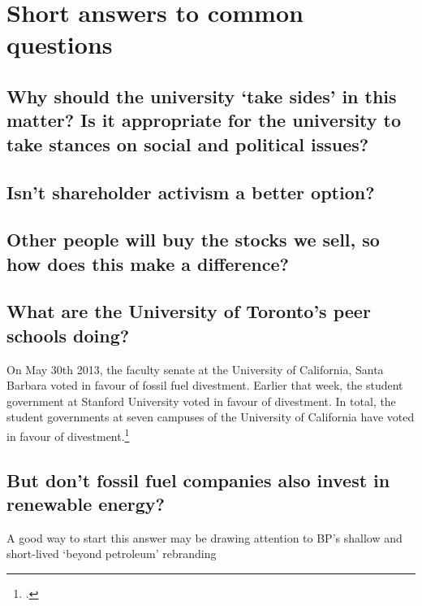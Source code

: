 


	\section{Short answers to common questions}



	\subsection{Why should the university `take sides' in this matter? Is it appropriate for the university to take stances on social and political issues?}
	


	\subsection{Isn't shareholder activism a better option?}
	
	
	
	\subsection{Other people will buy the stocks we sell, so how does this make a difference?}
	
	
	
	\subsection{What are the University of Toronto's peer schools doing?}
	


On May 30th 2013, the faculty senate at the University of California, Santa Barbara voted in favour of fossil fuel divestment.
Earlier that week, the student government at Stanford University voted in favour of divestment.
In total, the student governments at seven campuses of the University of California have voted in favour of divestment.\footcite[][]{UCSB2013}


	
	\subsection{But don't fossil fuel companies also invest in renewable energy?}

\begin{vcom}
A good way to start this answer may be drawing attention to BP's shallow and short-lived `beyond petroleum' rebranding
\end{vcom}



